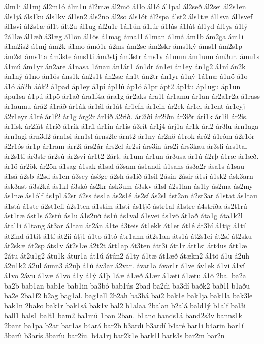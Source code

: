 {álm1i
ál1mj
ál2m1ó
álm1u
ál2mæ
ál2mö
á1lo
ál1ó
ál1pal
ál2seð
ál2sei
ál2s1en
áls1já
áls1ku
áls1kv
ál1sn2
áls2no
ál2so
áls1ót
ál2spa
álst2
áls1tæ
ál1sva
ál1svef
ál1svi
ál2s1æ
ál1t
ált2u
ál1ug
ál2u1r
1ál1ún
á1lúr
á1lús
á1lút
ál1yd
ál1ys
á1lý
2á1læ
ál1æð
á3læg
ál1ön
ál1ös
á1mag
áma1l
á1man
á1má
ám1b
ám2ga
ám1i
á1m2is2
á1mj
ám2k
á1mo
ámó1r
á2ms
ám2se
ám2skr
áms1ký
áms1l
ám2s1p
ám2st
áms1ta
ám3ste
áms1ti
ám3stj
ám3str
áms1v
á1mun
ám1unn
ám3ur.
ámu1s
á1mú
ám1yr
án2are
á1nasa
1ánau
án1ár1
án1dr
án1ei
án1ey
án1g2
á1ní
án2k
án1ný
á1no
án1ós
áns1k
án2s1t
án2sæ
án1t
án2tr
án1yr
á1ný
1á1næ
á1nö
á1o
á1ó
áó2h
áók2
á1pad
áp1ey
á1pí
áp1lú
áp1ó
á1pr
ápt2
áp1tu
áp1ugu
áp1un
ápu1sa
á1pú
á1pö
ár1að
ára1f4a
ára1g
ár2aks
ára1l
ár1amu
ár1an
ár2a1r2a
á1rass
ár1aumu
árá2
á1ráð
ár1ák
ár1ál
ár1át
ár1efn
ár1ein
ár2ek
ár1el
ár1ent
ár1eyj
á2r1eyr
á1ré
ár1f2
ár1g
árg2r
ár1ið
á2rið.
ár2iði
ár2iðn
ár3iðr
ári1k
ár1il
ár2is.
ár1isk
ár2íát
á1ríð
á1rík
á1ríl
ár1ín
ár1ís
á3rít
ár1j4
árj1a
ár1k
árl2
ár3lu
árn1aga
árn1agi
árn3d2
árn1si
árn1sl
árns2le
árnt2
ár1ny
ár2nö
á1rok
áró2
á1róm
á2r1ór
á2r1ós
ár1p
ár1ram
árr2i
árs2ár
árs2el
ár2si
árs3in
árs2í
árs3kau
ár3sli
árs1tal
ár2s1ti
ár3str
ár2sú
ár2svi
ár1t2
2árt.
ár1um
ár1un
ár3usa
ár1ú
á2rþ
á1ræ
ár1æð.
ár1ö
ár2ök
ár2ön
á1sag
á1sak
á1sal
á3sam
ás1andi
á1sans
ás3a2r
ása1s
á1sau
á1sá
á2sb
á2sd
ás1en
á3sey
ás3ge
á2sh
ás1ið
á1sil
2ásin
2ásir
á1sí
á1sk2
ásk3arn
ásk3ast
á3s2ká
ás1kl
á3skó
ás2kr
ásk3um
á3skv
á1sl
á2s1lan
ás1ly
ás2ma
ás2my
ás1næ
ás1ólf
ás1pl
á2sr
á2ss
áss1a
ás2s1é
ás2sí
ás2sl
ást2an
á2st3ar
á1stat
ás1tau
á1stá
á1ste
á2st1efl
á2s1ten
á1stim
á1stí
ás1tjö
ástr1al
á1stre
á4stríða
ás2t1rú
ást1ræ
ást1s
á2stú
ás1u
á1s2uð
ás1ú
ás1val
á1svei
ás1vö
át1að
áta1g
áta1k2l
átal1i
á1tang
át3ar
á1tau
át2án
á1te
á3teis
át1ekk
át1er
át1é
át3hí
á1tig
á1til
át2ind
á1tit
á1tí
át2íi
átj1
á1to
á1tó
átr1ann
át2s1an
áts1á
át2s1ei
át2sí
át2sku
át2skæ
át2sp
áts1v
át2s1æ
á2t2t
átt1ap
át3ten
átt3i
átt1r
átt1si
átt4us
átt1æ
2átu
át2u1g2
átu1k
átur1a
át1ú
átún2
á1ty
á1tæ
át1æð
átækn2
á1tö
á1u
á2uh
á2u1k2
á2ul
áunn3
á2uþ
á1ú
áv3ar
á2var.
ávar1a
ávar1r
á1ve
áv1ek
á1vi
á1ví
á1vo
2ávu
á1væ
á1vö
á1y
á1ý
á1þ
1áæ
á1æð
á1ær
á1æti
á1ætu
á1ö
2ba.
ba2a
ba2b
bab1an
bab1e
bab1in
ba3bó
bab1ús
2bad
ba2di
ba3dí
baðk2
bað1l
b1aðu
ba2e
2ba1f2
b2ag
bag1al.
bag1all
2b2ah
ba3há
bai2
bak1e
bak1ja
bak1la
bak3le
bak1n
2bako
bak1r
bak1sá
bak1v
bal2
b1alaa
2balan
b2alá
bald1ý
b1alf
bal3i
ball1
bals1
balt1
bam2
ba1mú
1ban
2ban.
b1anc
bands1á
band2s3v
banns1k
2bant
ba1pa
b2ar
bar1as
b4ará
bar2b
b3ardi
b3ardí
b4aré
bar1i
b4arin
bar1í
3baríi
b3arís
3baríu
bar2íu.
b4a1rj
bar2k1e
bark1l
bark3s
bar2m
bar2n
}

